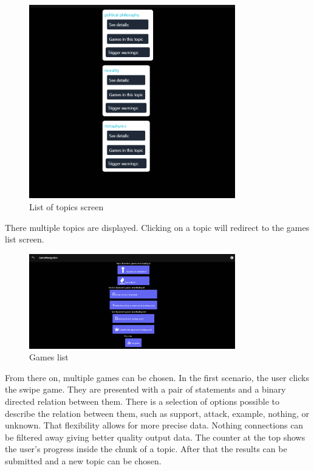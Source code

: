 \documentclass{report}
\begin{document}
\begin{figure}[h]
    \centering
    \includegraphics[width=0.8\textwidth]{./images/list-of-topics.png}
    \caption{List of topics screen}
\end{figure}
There multiple topics are displayed. Clicking on a topic will redirect to the games list screen.

\begin{figure}[h]
    \centering
    \includegraphics[width=0.8\textwidth]{./images/game-list.png}
    \caption{Games list}
\end{figure}
From there on, multiple games can be chosen.
In the first scenario, the user clicks the swipe game.
They are presented with a pair of statements and a binary directed relation between them.
There is a selection of options possible to describe the relation between them, such as support, attack, example, nothing, or unknown. That flexibility allows for more precise data. Nothing connections can be filtered away giving better quality output data.
The counter at the top shows the user's progress inside the chunk of a topic. After that the results can be submitted and a new topic can be chosen.
\end{document}
